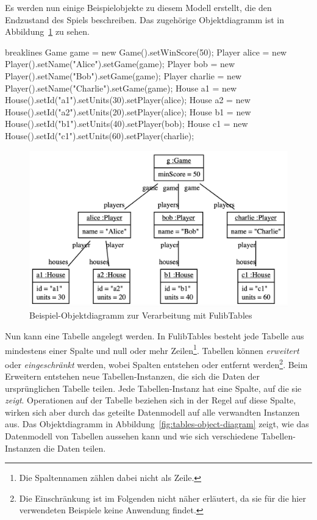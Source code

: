 Es werden nun einige Beispielobjekte zu diesem Modell erstellt, die den Endzustand des Spiels beschreiben.
Das zugehörige Objektdiagramm ist in Abbildung~\ref{fig:game-object-diagram} zu sehen.

\begin{jcodeblock*}{breaklines}
    Game game = new Game().setWinScore(50);
    Player alice = new Player().setName("Alice").setGame(game);
    Player bob = new Player().setName("Bob").setGame(game);
    Player charlie = new Player().setName("Charlie").setGame(game);
    House a1 = new House().setId("a1").setUnits(30).setPlayer(alice);
    House a2 = new House().setId("a2").setUnits(20).setPlayer(alice);
    House b1 = new House().setId("b1").setUnits(40).setPlayer(bob);
    House c1 = new House().setId("c1").setUnits(60).setPlayer(charlie);
\end{jcodeblock*}

\begin{figure}
    \includegraphics[width=\textwidth]{chapter/pattern-matching/img/game-object-diagram.png}
    \caption{Beispiel-Objektdiagramm zur Verarbeitung mit FulibTables}
    \label{fig:game-object-diagram}
\end{figure}

Nun kann eine Tabelle angelegt werden.
In FulibTables besteht jede Tabelle aus mindestens einer Spalte und null oder mehr Zeilen\footnote{Die Spaltennamen zählen dabei nicht als Zeile.}.
Tabellen können \emph{erweitert} oder \emph{eingeschränkt} werden, wobei Spalten entstehen oder entfernt werden\footnote{Die Einschränkung ist im Folgenden nicht näher erläutert, da sie für die hier verwendeten Beispiele keine Anwendung findet.}.
Beim Erweitern entstehen neue Tabellen-Instanzen, die sich die Daten der ursprünglichen Tabelle teilen.
Jede Tabellen-Instanz hat eine Spalte, auf die sie \emph{zeigt}.
Operationen auf der Tabelle beziehen sich in der Regel auf diese Spalte, wirken sich aber durch das geteilte Datenmodell auf alle verwandten Instanzen aus.
Das Objektdiagramm in Abbildung~\ref{fig:tables-object-diagram} zeigt, wie das Datenmodell von Tabellen aussehen kann und wie sich verschiedene Tabellen-Instanzen die Daten teilen.

